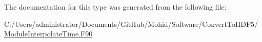 The documentation for this type was generated from the following file\+:\begin{DoxyCompactItemize}
\item 
C\+:/\+Users/administrator/\+Documents/\+Git\+Hub/\+Mohid/\+Software/\+Convert\+To\+H\+D\+F5/\mbox{\hyperlink{_module_interpolate_time_8_f90}{Module\+Interpolate\+Time.\+F90}}\end{DoxyCompactItemize}
